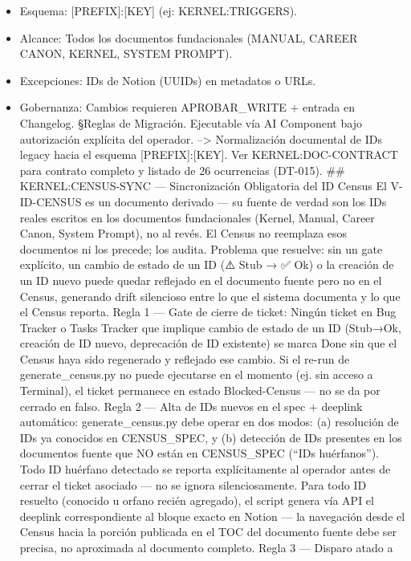 \documentclass[
]{article}
\providecommand{\tightlist}{%
  \setlength{\itemsep}{0pt}\setlength{\parskip}{0pt}}
\begin{document}
\begin{itemize}
\tightlist
\item
  Esquema: {[}PREFIX{]}:{[}KEY{]} (ej: KERNEL:TRIGGERS).
\item
  Alcance: Todos los documentos fundacionales (MANUAL, CAREER CANON,
  KERNEL, SYSTEM PROMPT).
\item
  Excepciones: IDs de Notion (UUIDs) en metadatos o URLs.
\item
  Gobernanza: Cambios requieren APROBAR\_WRITE + entrada en Changelog.
  §Reglas de Migración. Ejecutable vía AI Component bajo autorización
  explícita del operador. --\textgreater{} Normalización documental de
  IDs legacy hacia el esquema {[}PREFIX{]}:{[}KEY{]}. Ver
  KERNEL:DOC-CONTRACT para contrato completo y listado de 26 ocurrencias
  (DT-015). \#\# KERNEL:CENSUS-SYNC --- Sincronización Obligatoria del
  ID Census El V-ID-CENSUS es un documento derivado --- su fuente de
  verdad son los IDs reales escritos en los documentos fundacionales
  (Kernel, Manual, Career Canon, System Prompt), no al revés. El Census
  no reemplaza esos documentos ni los precede; los audita. Problema que
  resuelve: sin un gate explícito, un cambio de estado de un ID (⚠️ Stub
  → ✅ Ok) o la creación de un ID nuevo puede quedar reflejado en el
  documento fuente pero no en el Census, generando drift silencioso
  entre lo que el sistema documenta y lo que el Census reporta. Regla 1
  --- Gate de cierre de ticket: Ningún ticket en Bug Tracker o Tasks
  Tracker que implique cambio de estado de un ID (Stub→Ok, creación de
  ID nuevo, deprecación de ID existente) se marca Done sin que el Census
  haya sido regenerado y reflejado ese cambio. Si el re-run de
  generate\_census.py no puede ejecutarse en el momento (ej. sin acceso
  a Terminal), el ticket permanece en estado Blocked-Census --- no se da
  por cerrado en falso. Regla 2 --- Alta de IDs nuevos en el spec +
  deeplink automático: generate\_census.py debe operar en dos modos: (a)
  resolución de IDs ya conocidos en CENSUS\_SPEC, y (b) detección de IDs
  presentes en los documentos fuente que NO están en CENSUS\_SPEC (``IDs
  huérfanos''). Todo ID huérfano detectado se reporta explícitamente al
  operador antes de cerrar el ticket asociado --- no se ignora
  silenciosamente. Para todo ID resuelto (conocido u orfano recién
  agregado), el script genera vía API el deeplink correspondiente al
  bloque exacto en Notion --- la navegación desde el Census hacia la
  porción publicada en el TOC del documento fuente debe ser precisa, no
  aproximada al documento completo. Regla 3 --- Disparo atado a

\end{itemize}
\end{document}
